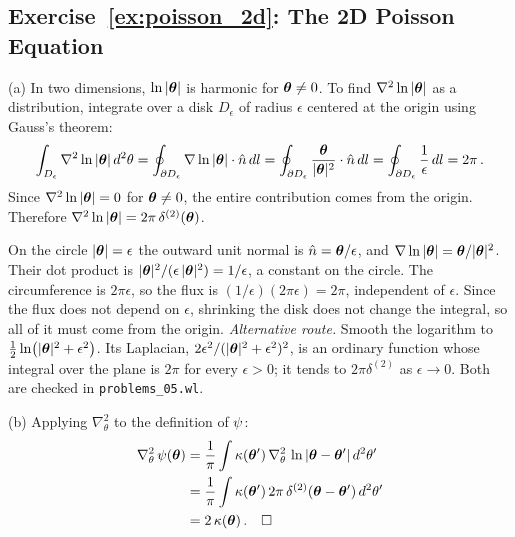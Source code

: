 \subsection*{Exercise~\ref{ex:poisson_2d}: The 2D Poisson Equation}

(a) In two dimensions, $\ln|\boldsymbol{\theta}|$ is harmonic for
$\boldsymbol{\theta} \neq 0$.  To find $\nabla^2\ln|\boldsymbol{\theta}|$ as a distribution,
integrate over a disk $D_\epsilon$ of radius $\epsilon$ centered at the
origin using Gauss's theorem:
\begin{equation*}
    \int_{D_\epsilon} \nabla^2\ln|\boldsymbol{\theta}|\,d^2\theta
    = \oint_{\partial D_\epsilon}
    \nabla\ln|\boldsymbol{\theta}| \cdot \hat{n}\, dl
    = \oint_{\partial D_\epsilon}
    \frac{\boldsymbol{\theta}}{|\boldsymbol{\theta}|^2} \cdot \hat{n}\, dl
    = \oint_{\partial D_\epsilon}
    \frac{1}{\epsilon}\, dl = 2\pi \,.
\end{equation*}
Since $\nabla^2\ln|\boldsymbol{\theta}| = 0$ for $\boldsymbol{\theta} \neq 0$, the
entire contribution comes from the origin.  Therefore
$\nabla^2\ln|\boldsymbol{\theta}| = 2\pi\,\delta^{(2)}(\boldsymbol{\theta})$. \checkmark
\begin{derivation}
On the circle $|\boldsymbol{\theta}| = \epsilon$ the outward unit normal is
$\hat n = \boldsymbol{\theta}/\epsilon$, and $\nabla\ln|\boldsymbol{\theta}| = \boldsymbol{\theta}/|\boldsymbol{\theta}|^2$.
Their dot product is $|\boldsymbol{\theta}|^2/(\epsilon\,|\boldsymbol{\theta}|^2) = 1/\epsilon$, a constant on the circle. The
circumference is $2\pi\epsilon$, so the flux is $(1/\epsilon)(2\pi\epsilon) = 2\pi$,
independent of $\epsilon$. Since the flux does not depend on $\epsilon$, shrinking the
disk does not change the integral, so all of it must come from the origin.
\emph{Alternative route.} Smooth the logarithm to
$\tfrac12\ln(|\boldsymbol{\theta}|^2 + \epsilon^2)$. Its Laplacian,
$2\epsilon^2/(|\boldsymbol{\theta}|^2 + \epsilon^2)^2$, is an ordinary function whose
integral over the plane is $2\pi$ for every $\epsilon > 0$; it tends to
$2\pi\delta^{(2)}$ as $\epsilon \to 0$. Both are checked in
\texttt{problems\_05.wl}.
\end{derivation}

(b) Applying $\nabla^2_\theta$ to the definition of $\psi$:
\begin{align*}
    \nabla^2_\theta\, \psi(\boldsymbol{\theta})
    &= \frac{1}{\pi} \int \kappa(\boldsymbol{\theta}')\,
    \nabla^2_\theta\, \ln|\boldsymbol{\theta} - \boldsymbol{\theta}'|\, d^2\theta' \\
    &= \frac{1}{\pi} \int \kappa(\boldsymbol{\theta}')\,
    2\pi\,\delta^{(2)}(\boldsymbol{\theta} - \boldsymbol{\theta}')\, d^2\theta' \\
    &= 2\,\kappa(\boldsymbol{\theta}) \,. \quad \square
\end{align*}

